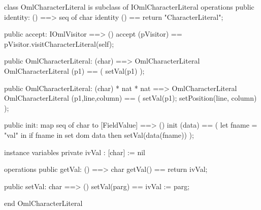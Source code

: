 \begin{vdm_al}
class OmlCharacterLiteral is subclass of IOmlCharacterLiteral
operations
  public identity: () ==> seq of char
  identity () == return "CharacterLiteral";

  public accept: IOmlVisitor ==> ()
  accept (pVisitor) == pVisitor.visitCharacterLiteral(self);

  public OmlCharacterLiteral:
    (char) ==> OmlCharacterLiteral
  OmlCharacterLiteral (p1) == 
    ( setVal(p1) );

  public OmlCharacterLiteral:
    (char) *
    nat *
    nat ==> OmlCharacterLiteral
  OmlCharacterLiteral (p1,line,column) == 
    ( setVal(p1);
      setPosition(line, column) );

  public init: map seq of char to [FieldValue] ==> ()
  init (data) ==
    ( let fname = "val" in
        if fname in set dom data
        then setVal(data(fname)) );

instance variables
  private ivVal : [char] := nil

operations
  public getVal: () ==> char
  getVal() == return ivVal;

  public setVal: char ==> ()
  setVal(parg) == ivVal := parg;

end OmlCharacterLiteral
\end{vdm_al}


